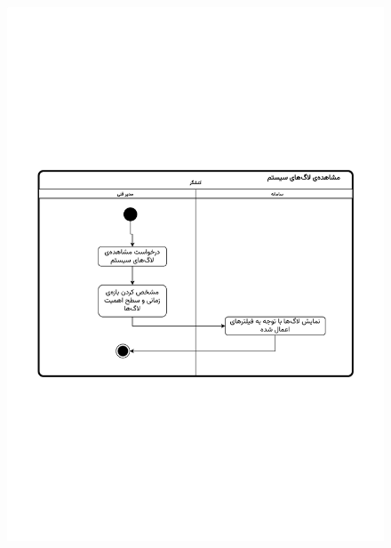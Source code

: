 \begin{figure}[ht!]
	\centering
	\includegraphics[scale=0.6, page=1]{figs/OOD-activity-syslog.pdf}
\end{figure}
\FloatBarrier
\newpage

